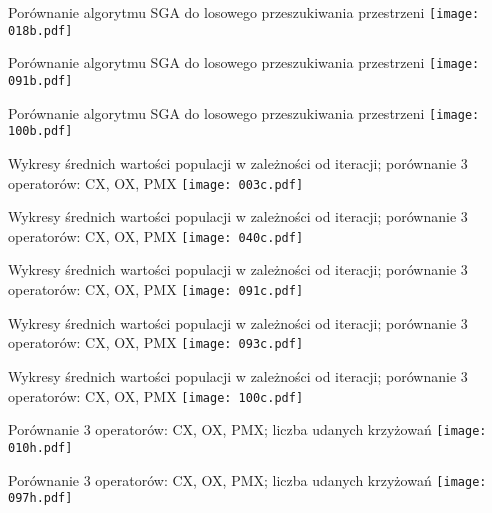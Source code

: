 \documentclass{beamer}
\begin{document}
\begin{frame}{Porównanie algorytmu SGA do losowego przeszukiwania przestrzeni}
  \texttt{[image: 018b.pdf]}
\end{frame}

\begin{frame}{Porównanie algorytmu SGA do losowego przeszukiwania przestrzeni}
  \texttt{[image: 091b.pdf]}
\end{frame}

\begin{frame}{Porównanie algorytmu SGA do losowego przeszukiwania przestrzeni}
  \texttt{[image: 100b.pdf]}
\end{frame}

\begin{frame}{Wykresy średnich wartości populacji w zależności od
    iteracji; porównanie 3 operatorów: CX, OX, PMX}
   \texttt{[image: 003c.pdf]}
\end{frame}

\begin{frame}{Wykresy średnich wartości populacji w zależności od
    iteracji; porównanie 3 operatorów: CX, OX, PMX}
   \texttt{[image: 040c.pdf]}
\end{frame}

\begin{frame}{Wykresy średnich wartości populacji w zależności od
    iteracji; porównanie 3 operatorów: CX, OX, PMX}
   \texttt{[image: 091c.pdf]}
\end{frame}

\begin{frame}{Wykresy średnich wartości populacji w zależności od
    iteracji; porównanie 3 operatorów: CX, OX, PMX}
   \texttt{[image: 093c.pdf]}
\end{frame}

\begin{frame}{Wykresy średnich wartości populacji w zależności od
    iteracji; porównanie 3 operatorów: CX, OX, PMX}
   \texttt{[image: 100c.pdf]}
\end{frame}

\begin{frame}{Porównanie 3 operatorów: CX, OX, PMX; liczba udanych krzyżowań}
  \texttt{[image: 010h.pdf]}
\end{frame}

\begin{frame}{Porównanie 3 operatorów: CX, OX, PMX; liczba udanych krzyżowań}
  \texttt{[image: 097h.pdf]}
\end{frame}
\end{document}
